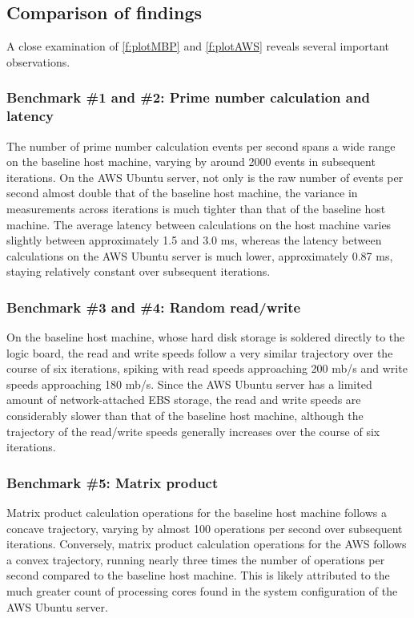 \documentclass[sigconf]{acmart}
\begin{document}
\subsection{Comparison of findings}

A close examination of \ref{f:plotMBP} and \ref{f:plotAWS} reveals several important observations.

\subsubsection{Benchmark \#1 and \#2: Prime number calculation and latency}

The number of prime number calculation events per second spans a wide range on the baseline host machine, varying by around 2000 events in subsequent iterations. On the AWS Ubuntu server, not only is the raw number of events per second almost double that of the baseline host machine, the variance in measurements across iterations is much tighter than that of the baseline host machine. The average latency between calculations on the host machine varies slightly between approximately 1.5 and 3.0 ms, whereas the latency between calculations on the AWS Ubuntu server is much lower, approximately 0.87 ms, staying relatively constant over subsequent iterations.

\subsubsection{Benchmark \#3 and \#4: Random read/write}

On the baseline host machine, whose hard disk storage is soldered directly to the logic board, the read and write speeds follow a very similar trajectory over the course of six iterations, spiking with read speeds approaching 200 mb/s and write speeds approaching 180 mb/s. Since the AWS Ubuntu server has a limited amount of network-attached EBS storage, the read and write speeds are considerably slower than that of the baseline host machine, although the trajectory of the read/write speeds generally increases over the course of six iterations.

\subsubsection{Benchmark \#5: Matrix product}

Matrix product calculation operations for the baseline host machine follows a concave trajectory, varying by almost 100 operations per second over subsequent iterations. Conversely, matrix product calculation operations for the AWS follows a convex trajectory, running nearly three times the number of operations per second compared to the baseline host machine. This is likely attributed to the much greater count of processing cores found in the system configuration of the AWS Ubuntu server.
\end{document}
